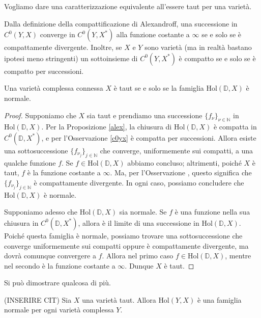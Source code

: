 Vogliamo dare una caratterizzazione equivalente all'essere taut per una varietà.

\begin{oss} \label{c0yx}
    Dalla definizione della compattificazione di Alexandroff, una successione in $C^0(Y,X)$ converge in $C^0(Y,X^*)$ alla funzione costante a $\infty$ se e solo se è compattamente divergente. Inoltre, se $X$ e $Y$ sono varietà (ma in realtà bastano ipotesi meno stringenti) un sottoinsieme di $C^0(Y,X^*)$ è compatto se e solo se è compatto per successioni.
\end{oss}

\begin{cor}
    Una varietà complessa connessa $X$ è taut se e solo se la famiglia $\text{Hol}(\mathbb{D},X)$ è normale.
\end{cor}
\begin{proof}
    Supponiamo che $X$ sia taut e prendiamo una successione $\{f_{\nu}\}_{\nu\in\mathbb{N}}$ in $\text{Hol}(\mathbb{D},X)$. Per la Proposizione \ref{alex}, la chiusura di $\text{Hol}(\mathbb{D},X)$ è compatta in $C^0(\mathbb{D},X^*)$, e per l'Osservazione \ref{c0yx} è compatta per successioni. Allora esiste una sottosuccessione $\{f_{\nu_j}\}_{j \in \mathbb{N}}$ che converge, uniformemente sui compatti, a una qualche funzione $f$. Se $f \in \text{Hol}(\mathbb{D},X)$ abbiamo concluso; altrimenti, poiché $X$ è taut, $f$ è la funzione costante a $\infty$. Ma, per l'Osservazione \label{c0yx}, questo significa che $\{f_{\nu_j}\}_{j \in \mathbb{N}}$ è compattamente divergente. In ogni caso, possiamo concludere che $\text{Hol}(\mathbb{D},X)$ è normale.

    Supponiamo adesso che $\text{Hol}(\mathbb{D},X)$ sia normale. Se $f$ è una funzione nella sua chiusura in $C^0(\mathbb{D},X^*)$, allora è il limite di una successione in $\text{Hol}(\mathbb{D},X)$. Poiché questa famiglia è normale, possiamo trovare una sottosuccessione che converge uniformemente sui compatti oppure è compattamente divergente, ma dovrà comunque convergere a $f$. Allora nel primo caso $f \in \text{Hol}(\mathbb{D},X)$, mentre nel secondo è la funzione costante a $\infty$. Dunque $X$ è taut.
\end{proof}

Si può dimostrare qualcosa di più.

\begin{prop}
    (INSERIRE CIT) Sia $X$ una varietà taut. Allora $\text{Hol}(Y,X)$ è una famiglia normale per ogni varietà complessa $Y$.
\end{prop}

